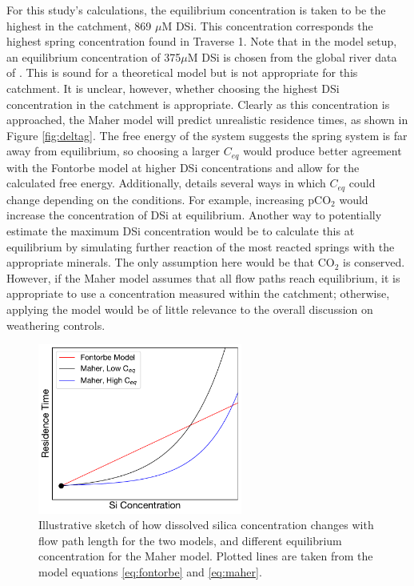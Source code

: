 For this study's calculations, the equilibrium concentration is taken to be the highest in the catchment, 869 $\mu$M DSi. This concentration corresponds the highest spring concentration found in Traverse 1. Note that in the \textcite{maherHydrologicRegulationChemical2014} model setup, an equilibrium concentration of 375$\mu$M DSi is chosen from the global river data of \textcite{gaillardetGlobalSilicateWeathering1999}. This is sound for a theoretical model but is not appropriate for this catchment. It is unclear, however, whether choosing the highest DSi concentration in the catchment is appropriate. Clearly as this concentration is approached, the Maher model will predict unrealistic residence times, as shown in Figure \ref{fig:deltag}. The free energy of the system suggests the spring system is far away from equilibrium, so choosing a larger $C_{eq}$ would produce better agreement with the Fontorbe model at higher DSi concentrations and allow for the calculated free energy. Additionally, \textcite{maherRoleFluidResidence2011} details several ways in which $C_{eq}$ could change depending on the conditions. For example, increasing pCO$_2$ would increase the concentration of DSi at equilibrium. Another way to potentially estimate the maximum DSi concentration would be to calculate this at equilibrium by simulating further reaction of the most reacted springs with the appropriate minerals. The only assumption here would be that CO$_2$ is conserved. However, if the Maher model assumes that all flow paths reach equilibrium, it is appropriate to use a concentration measured within the catchment; otherwise, applying the model would be of little relevance to the overall discussion on weathering controls.

\begin{figure}[h]
    \centering
    \includegraphics[width=0.6\textwidth]{Linear_vs_Exponential_Comparison.pdf}
    \caption{Illustrative sketch of how dissolved silica concentration changes with flow path length for the two models, and different equilibrium concentration for the Maher model. Plotted lines are taken from the model equations \ref{eq:fontorbe} and \ref{eq:maher}.}
    \label{fig:comparisonceq}
\end{figure}

